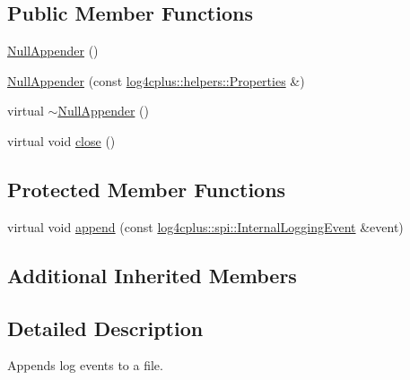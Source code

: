 \subsection*{Public Member Functions}
\begin{DoxyCompactItemize}
\item 
\hyperlink{classlog4cplus_1_1NullAppender_a9145aee45fa8da42ef55739bfabafa88}{Null\-Appender} ()
\item 
\hyperlink{classlog4cplus_1_1NullAppender_a0222afbf72b1ab2125fb8b6fa30f3d22}{Null\-Appender} (const \hyperlink{classlog4cplus_1_1helpers_1_1Properties}{log4cplus\-::helpers\-::\-Properties} \&)
\item 
virtual \hyperlink{classlog4cplus_1_1NullAppender_ad734894d29755e34a6667734adc769fe}{$\sim$\-Null\-Appender} ()
\item 
virtual void \hyperlink{classlog4cplus_1_1NullAppender_adf4413c4066838f47243f0a0ad190e51}{close} ()
\end{DoxyCompactItemize}
\subsection*{Protected Member Functions}
\begin{DoxyCompactItemize}
\item 
virtual void \hyperlink{classlog4cplus_1_1NullAppender_aaf01d8525186e6a8fec059b28435d5fb}{append} (const \hyperlink{classlog4cplus_1_1spi_1_1InternalLoggingEvent}{log4cplus\-::spi\-::\-Internal\-Logging\-Event} \&event)
\end{DoxyCompactItemize}
\subsection*{Additional Inherited Members}


\subsection{Detailed Description}
Appends log events to a file. 

